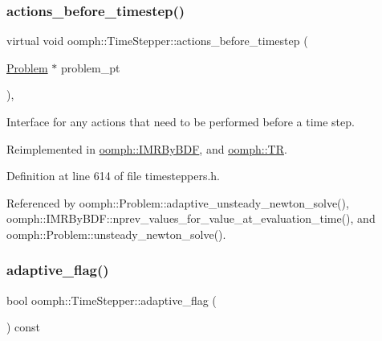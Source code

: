 \mbox{\label{classoomph_1_1TimeStepper_a36cbcee0c1127085ba3aa2331bfc0f74}} 
\subsubsection{\texorpdfstring{actions\+\_\+before\+\_\+timestep()}{actions\_before\_timestep()}}
{\footnotesize\ttfamily virtual void oomph\+::\+Time\+Stepper\+::actions\+\_\+before\+\_\+timestep (\begin{DoxyParamCaption}\item[{\hyperlink{classoomph_1_1Problem}{Problem} $\ast$}]{problem\+\_\+pt }\end{DoxyParamCaption})\hspace{0.3cm}{\ttfamily [inline]}, {\ttfamily [virtual]}}

Interface for any actions that need to be performed before a time step. 

Reimplemented in \hyperlink{classoomph_1_1IMRByBDF_abc155a68889d297f732a083d911b4627}{oomph\+::\+I\+M\+R\+By\+B\+DF}, and \hyperlink{classoomph_1_1TR_aa8ba8454bc4fcc3ad3c95550663df388}{oomph\+::\+TR}.



Definition at line 614 of file timesteppers.\+h.



Referenced by oomph\+::\+Problem\+::adaptive\+\_\+unsteady\+\_\+newton\+\_\+solve(), oomph\+::\+I\+M\+R\+By\+B\+D\+F\+::nprev\+\_\+values\+\_\+for\+\_\+value\+\_\+at\+\_\+evaluation\+\_\+time(), and oomph\+::\+Problem\+::unsteady\+\_\+newton\+\_\+solve().

\mbox{\label{classoomph_1_1TimeStepper_a6168cca9a2a3c7bfd50c8797aed72d2d}} 
\subsubsection{\texorpdfstring{adaptive\+\_\+flag()}{adaptive\_flag()}}
{\footnotesize\ttfamily bool oomph\+::\+Time\+Stepper\+::adaptive\+\_\+flag (\begin{DoxyParamCaption}{ }\end{DoxyParamCaption}) const\hspace{0.3cm}{\ttfamily [inline]}}



